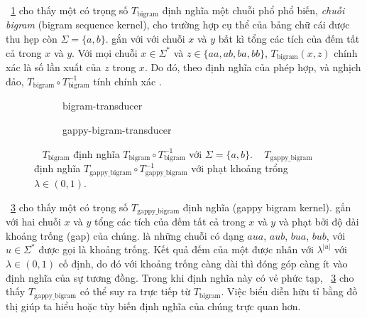 \begin{exmp}
  \figurename~\ref{fig:bigram-transducer} cho thấy một  có trọng
  số $T_\text{bigram}$ định nghĩa một  chuỗi phổ phổ biến,
  \emph{ chuỗi bigram} (bigram sequence kernel), cho trường hợp cụ
  thể của bảng chữ cái được thu hẹp còn $\Sigma = \{a, b\}$. 
   gắn với với chuỗi $x$ và $y$ bất kì tổng các tích của đếm tất cả
   trong $x$ và $y$. Với mọi chuỗi $x \in \Sigma^\ast$ và
   $z \in \{aa, ab, ba, bb\}$, $T_\text{bigram}(x, z)$ chính xác là
  số lần xuất của  $z$ trong $x$. Do đó, theo định nghĩa của phép
  hợp, và nghịch đảo, $T_\text{bigram} \circ T_\text{bigram}^{-1}$ tính chính
  xác  .

  \begin{figure}[htbp]
    \centering

    \begin{subfigure}{\textwidth}
      \centering
      {bigram-transducer}
      \caption{}
      \label{fig:bigram-transducer}
    \end{subfigure}

    \begin{subfigure}{\textwidth}
      \centering
      {gappy-bigram-transducer}
      \caption{}
      \label{fig:gappy-bigram-transducer}
    \end{subfigure}
    \caption[\protect{} \protect{} và \protect{}]{~ $T_\text{bigram}$
    định nghĩa   $T_\text{bigram} \circ
    T_\text{bigram}^{-1}$ với $\Sigma = \{a, b\}$.
    ~
    $T_\text{gappy\_bigram}$ định nghĩa  
    $T_\text{gappy\_bigram} \circ T_\text{gappy\_bigram}^{-1}$ với phạt khoảng
    trổng $\lambda \in (0, 1)$.}
  \end{figure}

  \figurename~\ref{fig:gappy-bigram-transducer} cho thấy một  có
  trọng số $T_\text{gappy\_bigram}$ định nghĩa \emph{ } (gappy bigram kernel).   gắn với hai
  chuỗi $x$ và $y$ tổng các tích của đếm tất cả 
  trong $x$ và $y$ và phạt bởi độ dài khoảng trống (gap) của chúng.  là những chuỗi có dạng $aua$, $aub$, $bua$, $bub$, với $u \in
  \Sigma^\ast$ được gọi là khoảng trống. Kết quả đếm của một 
  được nhân với $\lambda^{|u|}$ với $\lambda \in (0, 1)$ cố định, do đó
   với khoảng trống càng dài thì đóng góp càng ít vào định
  nghĩa của sự tương đồng. Trong khi định nghĩa này có vẻ phức tạp,
  \figurename~\ref{fig:gappy-bigram-transducer} cho thấy
  $T_\text{gappy\_bigram}$ có thể suy ra trực tiếp từ $T_\text{bigram}$. Việc
  biểu diễn  hữu tỉ bằng đồ thị giúp ta hiểu hoặc tùy biến định
  nghĩa của chúng trực quan hơn.
\end{exmp}

